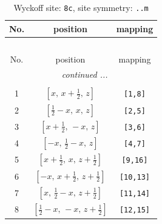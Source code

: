 \documentclass[fleqn,8pt]{jsarticle}
\begin{document}
\renewcommand{\arraystretch}{1.2}
\begin{longtable}{ccc}
\caption{Wyckoff site: {\tt 8c}, site symmetry: {\tt ..m}}
 \\
 \hline \hline
No. & position & mapping \\ \hline \endfirsthead

\multicolumn{2}{l}{\tablename\ \thetable{}} \\
 \hline \hline
No. & position & mapping \\ \hline \endhead

 \hline \hline
\multicolumn{2}{r}{\footnotesize\it continued ...} \\ \endfoot

 \hline \hline
\multicolumn{2}{r}{} \\ \endlastfoot

1 & $\left[ x,\, x + \frac{1}{2},\, z \right]$ & {\tt [1,8]} \\ \hline
2 & $\left[ \frac{1}{2} - x,\, x,\, z \right]$ & {\tt [2,5]} \\ \hline
3 & $\left[ x + \frac{1}{2},\, - x,\, z \right]$ & {\tt [3,6]} \\ \hline
4 & $\left[ - x,\, \frac{1}{2} - x,\, z \right]$ & {\tt [4,7]} \\ \hline
5 & $\left[ x + \frac{1}{2},\, x,\, z + \frac{1}{2} \right]$ & {\tt [9,16]} \\ \hline
6 & $\left[ - x,\, x + \frac{1}{2},\, z + \frac{1}{2} \right]$ & {\tt [10,13]} \\ \hline
7 & $\left[ x,\, \frac{1}{2} - x,\, z + \frac{1}{2} \right]$ & {\tt [11,14]} \\ \hline
8 & $\left[ \frac{1}{2} - x,\, - x,\, z + \frac{1}{2} \right]$ & {\tt [12,15]} \\
\end{longtable}
\renewcommand{\arraystretch}{1.2}
\end{document}
